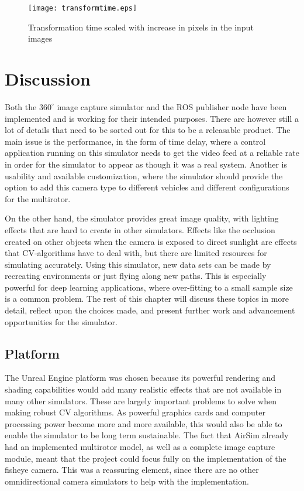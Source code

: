 \begin{figure}[!htb]
    \centering
    \texttt{[image: transformtime.eps]}
    \caption{Transformation time scaled with increase in pixels in the input images}
    \label{fig:res_time_scale_plot}
\end{figure}

\newpage\section{Discussion}

Both the $360^\circ$ image capture simulator and the ROS publisher node have been implemented and is working for their intended purposes. There are however still a lot of details that need to be sorted out for this to be a releasable product. The main issue is the performance, in the form of time delay, where a control application running on this simulator needs to get the video feed at a reliable rate in order for the simulator to appear as though it was a real system. Another is usability and available customization, where the simulator should provide the option to add this camera type to different vehicles and different configurations for the multirotor.

On the other hand, the simulator provides great image quality, with lighting effects that are hard to create in other simulators. Effects like the occlusion created on other objects when the camera is exposed to direct sunlight are effects that CV-algorithms have to deal with, but there are limited resources for simulating accurately. Using this simulator, new data sets can be made by recreating environments or just flying along new paths. This is especially powerful for deep learning applications, where over-fitting to a small sample size is a common problem. The rest of this chapter will discuss these topics in more detail, reflect upon the choices made, and present further work and advancement opportunities for the simulator. 

\subsection{Platform}

The Unreal Engine platform was chosen because its powerful rendering and shading capabilities would add many realistic effects that are not available in many other simulators. These are largely important problems to solve when making robust CV algorithms. As powerful graphics cards and computer processing power become more and more available, this would also be able to enable the simulator to be long term sustainable. The fact that AirSim already had an implemented multirotor model, as well as a complete image capture module, meant that the project could focus fully on the implementation of the fisheye camera. This was a reassuring element, since there are no other omnidirectional camera simulators to help with the implementation.

